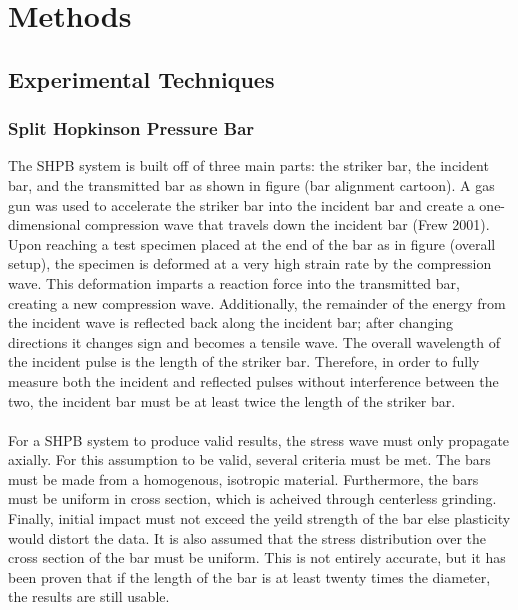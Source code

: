 \documentclass[12pt]{article}
\begin{document}
\section{Methods}

\subsection{Experimental Techniques} 

\subsubsection {Split Hopkinson Pressure Bar} %
The SHPB system is built off of three main parts: the striker bar, the incident bar, and the transmitted bar as shown in figure (bar alignment cartoon). A gas gun was used to accelerate the striker bar into the incident bar and create a one-dimensional compression wave that travels down the incident bar (Frew 2001). Upon reaching a test specimen placed at the end of the bar as in figure (overall setup), the specimen is deformed at a very high strain rate by the compression wave. This deformation imparts a reaction force into the transmitted bar, creating a new compression wave. Additionally, the remainder of the energy from the incident wave is reflected back along the incident bar; after changing directions it changes sign and becomes a tensile wave. The overall wavelength of the incident pulse is the length of the striker bar. Therefore, in order to fully measure both the incident and reflected pulses without interference between the two, the incident bar must be at least twice the length of the striker bar.
\\ \\
For a SHPB system to produce valid results, the stress wave must only propagate axially. For this assumption to be valid, several criteria must be met. The bars must be made from a homogenous, isotropic material. Furthermore, the bars must be uniform in cross section, which is acheived through centerless grinding. Finally, initial impact must not exceed the yeild strength of the bar else plasticity would distort the data. It is also assumed that the stress distribution over the cross section of the bar must be uniform. This is not entirely accurate, but it has been proven that if the length of the bar is at least twenty times the diameter, the results are still usable. 
\\ \\
\end{document}
